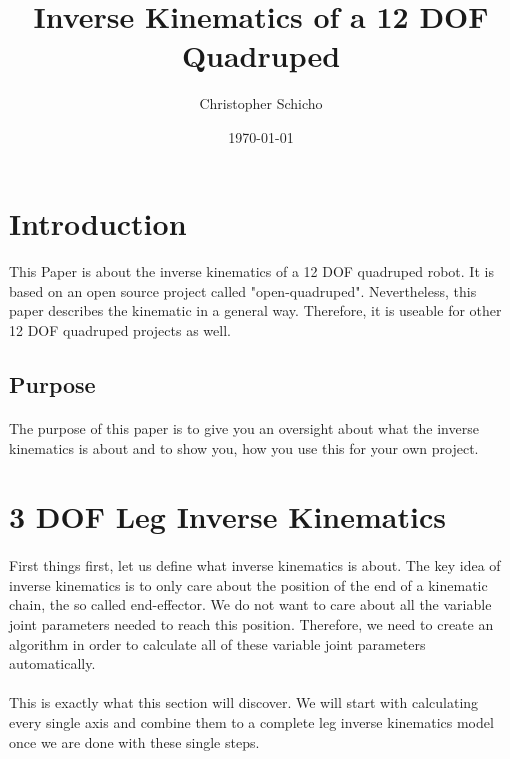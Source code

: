 \documentclass{article}
\title{Inverse Kinematics of a 12 DOF Quadruped}
\author{Christopher Schicho}
\date{\today}
\begin{document}
    \maketitle
    \tableofcontents
    \pagebreak



    \section{Introduction}
    \paragraph{}  
    This Paper is about the inverse kinematics of a 12 DOF quadruped robot. It is based on an open source project called "open-quadruped". Nevertheless, this paper describes the kinematic in a general way. Therefore, it is useable for other 12 DOF quadruped projects as well. 

    \subsection{Purpose}
    \paragraph{}
    The purpose of this paper is to give you an oversight about what the inverse kinematics is about and to show you, how you use this for your own project. 


    
    \section{3 DOF Leg Inverse Kinematics}
    \paragraph{}
    First things first, let us define what inverse kinematics is about. The key idea of inverse kinematics is to only care about the position of the end of a kinematic chain, the so called end-effector. We do not want to care about all the variable joint parameters needed to reach this position. Therefore, we need to create an algorithm in order to calculate all of these variable joint parameters automatically. 
    \paragraph{}
    This is exactly what this section will discover. We will start with calculating every single axis and combine them to a complete leg inverse kinematics model once we are done with these single steps.
    
\end{document}

